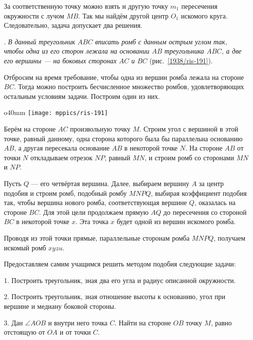 За соответственную точку можно взять и другую точку $m_1$ пересечения окружности с лучом $MB$.
Так мы найдём другой центр $O_1$ искомого круга.
Следовательно, задача допускает два решения.

\medskip

\smallskip
{}.
\emph{В данный треугольник $ABC$ вписать ромб с данным острым углом так, чтобы одна из его сторон лежала на основании $AB$ треугольника $ABC$, а две его вершины — на боковых сторонах $AC$ и $BC$} (рис.~\ref{1938/ris-191}).

Отбросим на время требование, чтобы одна из вершин ромба лежала на стороне $BC$.
Тогда можно построить бесчисленное множество ромбов, удовлетворяющих остальным условиям задачи.
Построим один из них.

\begin{wrapfigure}{o}{40mm}
\centering
\texttt{[image: mppics/ris-191]}
\caption{}\label{1938/ris-191}
\end{wrapfigure}

Берём на стороне $AC$ произвольную точку $M$.
Строим угол с вершиной в этой точке, равный данному, одна сторона которого была бы параллельна основанию $AB$, а другая пересекала основание $AB$ в некоторой точке $N$.
На стороне $AB$ от точки $N$ откладываем отрезок $NP$, равный $MN$, и строим ромб со сторонами $MN$ и $NP$.

Пусть $Q$ — его четвёртая вершина.
Далее, выбираем вершину $A$ за центр подобия и строим ромб, подобный ромбу $MNPQ$, выбирая коэффициент подобия так, чтобы вершина нового ромба, соответствующая вершине $Q$, оказалась на стороне $BC$.
Для этой цели продолжаем прямую $AQ$ до пересечения со стороной $BC$ в некоторой точке $x$.
Эта точка $x$ будет одной из вершин искомого ромба.

{\sloppy 
Проводя из этой точки прямые, параллельные сторонам ромба $MNPQ$, получаем искомый ромб $xyzu$.

}

Предоставляем самим учащимся решить методом подобия следующие задачи:

1.
Построить треугольник, зная два его угла и радиус описанной окружности.

2.
Построить треугольник, зная отношение высоты к основанию, угол при вершине и медиану боковой стороны.

3.
Дан $\angle AOB$ и внутри него точка $C$.
Найти на стороне $OB$ точку $M$, равно отстоящую от $OA$ и от точки $C$.

